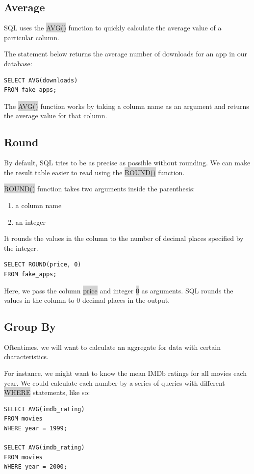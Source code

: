 \documentclass[11pt]{article}
\begin{document}
{{\subsection{Average}
SQL uses the \colorbox{lightgray}{AVG()} function to quickly calculate the average value of a particular column.

The statement below returns the average number of downloads for an app in our database:
\begin{lstlisting}
SELECT AVG(downloads)
FROM fake_apps;
\end{lstlisting}
The \colorbox{lightgray}{AVG()} function works by taking a column name as an argument and returns the average value for that column.

\subsection{Round}
By default, SQL tries to be as precise as possible without rounding. We can make the result table easier to read using the \colorbox{lightgray}{ROUND()} function.

\colorbox{lightgray}{ROUND()} function takes two arguments inside the parenthesis:
\begin{enumerate}[leftmargin = *]
\item a column name
\item an integer
\end{enumerate}
It rounds the values in the column to the number of decimal places specified by the integer.
\begin{lstlisting}
SELECT ROUND(price, 0)
FROM fake_apps;
\end{lstlisting}
Here, we pass the column \colorbox{lightgray}{price} and integer \colorbox{lightgray}{0} as arguments. SQL rounds the values in the column to 0 decimal places in the output.

\subsection{Group By}
Oftentimes, we will want to calculate an aggregate for data with certain characteristics.

For instance, we might want to know the mean IMDb ratings for all movies each year. We could calculate each number by a series of queries with different \colorbox{lightgray}{WHERE} statements, like so:
\begin{lstlisting}
SELECT AVG(imdb_rating)
FROM movies
WHERE year = 1999;

SELECT AVG(imdb_rating)
FROM movies
WHERE year = 2000;


\end{lstlisting}}}
\end{document}
